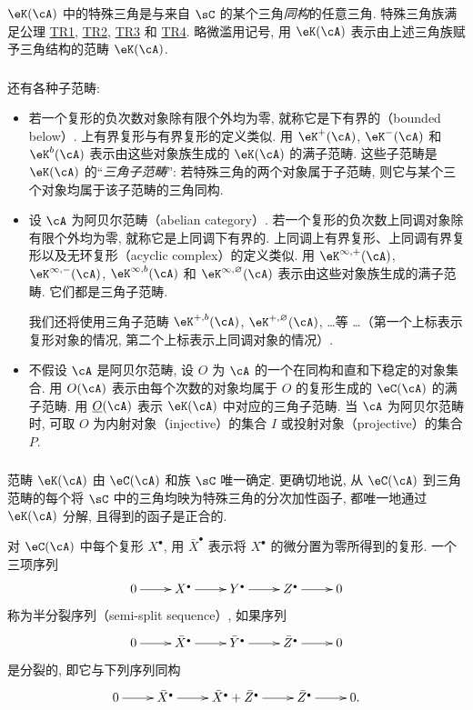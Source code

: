 $\eK(\cA)$ 中的特殊三角是与来自 $\sC$ 的某个三角\emph{同构}的任意三角. 特殊三角族满足公理 \hyperlink{VIII:TR1}{TR1}, \hyperlink{VIII:TR2}{TR2}, \hyperlink{VIII:TR3}{TR3} 和 \hyperlink{VIII:TR4}{TR4}. 略微滥用记号, 用 $\eK(\cA)$ 表示由上述三角族赋予三角结构的范畴 $\eK(\cA)$.

\subsubsection{}\label{VIII:1-2-3}

还有各种子范畴:
\begin{itemize}
  \item 若一个复形的负次数对象除有限个外均为零, 就称它是下有界的（bounded below）. 上有界复形与有界复形的定义类似. 用 $\eK^+(\cA)$, $\eK^-(\cA)$ 和 $\eK^b(\cA)$ 表示由这些对象族生成的 $\eK(\cA)$ 的满子范畴. 这些子范畴是 $\eK(\cA)$ 的“\emph{三角子范畴}”: 若特殊三角的两个对象属于子范畴, 则它与某个三个对象均属于该子范畴的三角同构.
  \item 设 $\cA$ 为阿贝尔范畴（abelian category）. 若一个复形的负次数上同调对象除有限个外均为零, 就称它是上同调下有界的. 上同调上有界复形、上同调有界复形以及无环复形（acyclic complex）的定义类似. 用 $\eK^{\infty,+}(\cA)$, $\eK^{\infty,-}(\cA)$, $\eK^{\infty,b}(\cA)$ 和 $\eK^{\infty,\varnothing}(\cA)$ 表示由这些对象族生成的满子范畴. 它们都是三角子范畴.

    我们还将使用三角子范畴 $\eK^{+,b}(\cA)$, $\eK^{+,\varnothing}(\cA)$, \ldots 等 \ldots （第一个上标表示复形对象的情况, 第二个上标表示上同调对象的情况）.
  \item 不假设 $\cA$ 是阿贝尔范畴, 设 $O$ 为 $\cA$ 的一个在同构和直和下稳定的对象集合. 用 $O(\cA)$ 表示由每个次数的对象均属于 $O$ 的复形生成的 $\eC(\cA)$ 的满子范畴. 用 $\underline O(\cA)$ 表示 $\eK(\cA)$ 中对应的三角子范畴. 当 $\cA$ 为阿贝尔范畴时, 可取 $O$ 为内射对象（injective）的集合 $I$ 或投射对象（projective）的集合 $P$.
\end{itemize}

\subsubsection{}\label{VIII:1-2-4}

范畴 $\eK(\cA)$ 由 $\eC(\cA)$ 和族 $\sC$ 唯一确定. 更确切地说, 从 $\eC(\cA)$ 到三角范畴的每个将 $\sC$ 中的三角均映为特殊三角的分次加性函子, 都唯一地通过 $\eK(\cA)$ 分解, 且得到的函子是正合的.

对 $\eC(\cA)$ 中每个复形 $X^\bullet$, 用 $\bar X^\bullet$ 表示将 $X^\bullet$ 的微分置为零所得到的复形. 一个三项序列
\[\xymatrix{
  0 \ar[r]
    & X^\bullet \ar[r]
    & Y^\bullet \ar[r]
    & Z^\bullet \ar[r]
    & 0
}\]
称为半分裂序列（semi-split sequence）, 如果序列
\[\xymatrix{
  0 \ar[r]
    & \bar X^\bullet \ar[r]
    & \bar Y^\bullet \ar[r]
    & \bar Z^\bullet \ar[r]
    & 0
}\]
是分裂的, 即它与下列序列同构
\[\xymatrix{
  0 \ar[r]
    & \bar X^\bullet \ar[r]
    & \bar X^\bullet + \bar Z^\bullet \ar[r]
    & \bar Z^\bullet \ar[r]
    & 0 \text{.}
}\]

